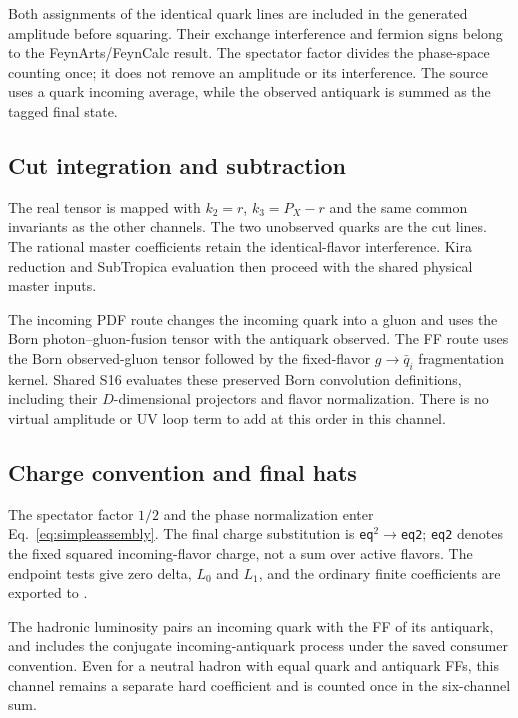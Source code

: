 \documentclass[11pt,a4paper]{article}
\begin{document}
Both assignments of the identical quark lines are included in the
generated amplitude before squaring. Their exchange interference and
fermion signs belong to the FeynArts/FeynCalc result. The spectator
factor divides the phase-space counting once; it does not remove an
amplitude or its interference. The source uses a quark incoming average,
while the observed antiquark is summed as the tagged final state.

\subsection{Cut integration and subtraction}

The real tensor is mapped with $k_2=r$, $k_3=P_X-r$ and the same common
invariants as the other channels. The two unobserved quarks are the cut
lines. The rational master coefficients retain the identical-flavor
interference. Kira reduction and SubTropica evaluation then proceed
with the shared physical master inputs.

The incoming PDF route changes the incoming quark into a gluon and uses
the Born photon--gluon-fusion tensor with the antiquark observed. The FF
route uses the Born observed-gluon tensor followed by the fixed-flavor
$g\to\bar q_i$ fragmentation kernel. Shared S16 evaluates these
preserved Born convolution definitions, including their $D$-dimensional
projectors and flavor normalization. There is no virtual amplitude or
UV loop term to add at this order in this channel.

\subsection{Charge convention and final hats}

The spectator factor $1/2$ and the phase normalization enter
Eq.~\eqref{eq:simpleassembly}. The final charge substitution is
\texttt{eq}$^2\to$\texttt{eq2}; \texttt{eq2} denotes the fixed
squared incoming-flavor charge, not a sum over active flavors. The
endpoint tests give zero delta, $L_0$ and $L_1$, and the ordinary finite
coefficients are exported to .

The hadronic luminosity pairs an incoming quark with the FF of its
antiquark, and includes the conjugate incoming-antiquark process under
the saved consumer convention. Even for a neutral hadron with equal
quark and antiquark FFs, this channel remains a separate hard
coefficient and is counted once in the six-channel sum.
\end{document}
